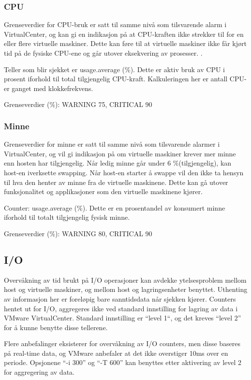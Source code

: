 \subsubsection*{CPU}
Grenseverdier for CPU-bruk er satt til samme nivå som tilsvarende alarm i VirtualCenter, og kan gi en indikasjon på at CPU-kraften ikke strekker til for en eller flere virtuelle maskiner. Dette kan føre til at virtuelle maskiner ikke får kjørt tid på de fysiske CPU-ene og går utover eksekvering av prosesser.  \cite{vmwarecounters}.

Teller som blir sjekket er usage.average (\%). Dette er aktiv bruk av CPU i prosent iforhold til total tilgjengelig CPU-kraft. Kalkuleringen her er antall CPU-er ganget med klokkefrekvens.

Grenseverdier (\%): WARNING 75, CRITICAL 90

\subsubsection*{Minne}
Grenseverdier for minne er satt til samme nivå som tilsvarende alarmer i VirtualCenter, og vil gi indikasjon på om virtuelle maskiner krever mer minne enn hosten har tilgjengelig. Når ledig minne går under 6 \%(tilgjengelig), kan host-en iverksette swapping. Når host-en starter å swappe vil den ikke ta hensyn til hva den henter av minne fra de virtuelle maskinene. Dette kan gå utover funksjonalitet og applikasjoner som den virtuelle maskinene kjører.

Counter: usage.average (\%). Dette er en prosentandel av konsumert minne iforhold til totalt tilgjengelig fysisk minne.

Grenseverdier (\%): WARNING 80, CRITICAL 90

\subsection*{I/O}
Overvåkning av tid brukt på I/O operasjoner kan avdekke ytelsesproblem mellom host og virtuelle maskiner, og mellom host og lagringsenheter benyttet. Uthenting av informasjon her er foreløpig bare sanntidsdata når sjekken kjører. Counters hentet ut for I/O, aggregeres ikke ved standard innstilling for lagring av data i VMware VirtualCenter. Standard innstilling er ``level 1``, og det kreves ``level 2'' for å kunne benytte disse tellerene.

Flere anbefalinger eksisterer for overvåkning av I/O counters, men disse baseres på real-time data, og VMware anbefaler at det ikke overstiger 10ms over en periode. Opsjonene ``-i 300'' og ``-T 600'' kan benyttes etter aktivering av level 2 for aggregering av data.

